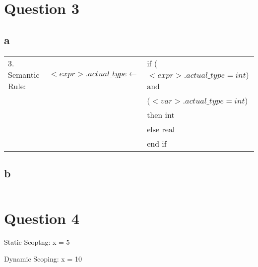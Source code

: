 \documentclass[12pt]{article}
\begin{document}
\pagebreak
\section{Question 3}

\subsection{a}
\begin{tabular}{l l l}
    3. Semantic Rule: & $<expr>.actual\_type \leftarrow$ & if ($<expr>.actual\_type = int$) and \\
    & &     ($<var>.actual\_type = int$) \\
    & &     then int \\
    & & else real \\
    & & end if
\end{tabular}

\subsection{b}
\begin{tabular}{l l l}
    


\end{tabular}


\section{Question 4}
Static Scoptng: x = 5

Dynamic Scoping: x = 10

\pagebreak
\end{document}
